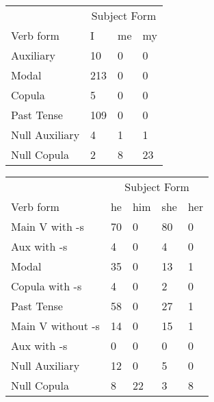 \begin{table}[]
    \begin{minipage}{0.5\textwidth}
    \centering
    \begin{tabular}{@{}llll@{}}
        \toprule
            &\multicolumn{3}{c}{Subject Form}\\
            \cline{2-4}
        Verb form & I & me & my \\
        \midrule
        Auxiliary & 10 & 0 & 0 \\
        Modal & 213 & 0 & 0 \\
        Copula & 5 & 0 & 0 \\
        Past Tense & 109 & 0 & 0 \\
        \hline
        Null Auxiliary & 4 & 1 & 1 \\
        Null Copula & 2 & 8 & 23 \\
        \bottomrule
    \end{tabular}
\end{minipage}
\begin{minipage}{0.5\textwidth}
    \centering
    \begin{tabular}{@{}lllll@{}}
        \toprule
            &\multicolumn{4}{c}{Subject Form}\\
            \cline{2-5}
        Verb form & he & him & she & her \\
        \midrule
        Main V with -s & 70 & 0 & 80 & 0 \\
        Aux with -s & 4 & 0 & 4 & 0 \\
        Modal & 35 & 0 & 13 & 1 \\
        Copula with -s & 4 & 0 & 2 & 0 \\
        Past Tense & 58 & 0 & 27 & 1 \\
        \hline
        Main V without -s & 14 & 0 & 15 & 1 \\
        Aux with -s & 0 & 0 & 0 & 0 \\
        Null Auxiliary & 12 & 0 & 5 & 0 \\
        Null Copula & 8 & 22 & 3 & 8 \\
        \bottomrule
    \end{tabular}
\end{minipage}
\end{table}
